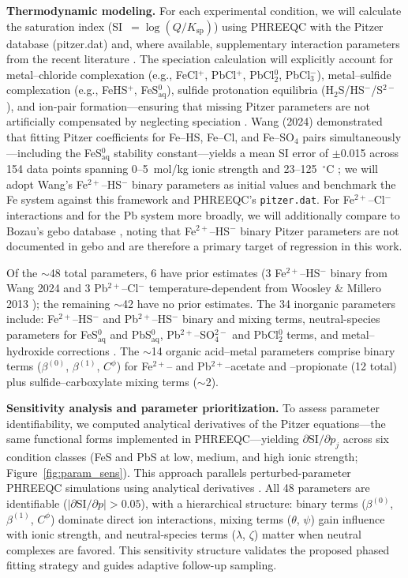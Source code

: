 \documentclass[12pt]{article}
\begin{document}
\textbf{Thermodynamic modeling.} For each experimental condition, we will calculate the saturation index (SI~$= \log(Q/K_{\text{sp}})$) using PHREEQC with the Pitzer database (pitzer.dat) and, where available, supplementary interaction parameters from the recent literature \cite{kan2019,wang2020,felmy2000}. The speciation calculation will explicitly account for metal--chloride complexation (e.g., FeCl$^+$, PbCl$^+$, PbCl$_2^0$, PbCl$_3^-$), metal--sulfide complexation (e.g., FeHS$^+$, FeS$^0_{\text{aq}}$), sulfide protonation equilibria (H$_2$S/HS$^-$/S$^{2-}$), and ion-pair formation---ensuring that missing Pitzer parameters are not artificially compensated by neglecting speciation \cite{felmy2000}. Wang (2024) demonstrated that fitting Pitzer coefficients for Fe--HS, Fe--Cl, and Fe--SO$_4$ pairs simultaneously---including the FeS$^0_{\text{aq}}$ stability constant---yields a mean SI error of $\pm$0.015 across 154 data points spanning 0--5~mol/kg ionic strength and 23--125~$^\circ$C \cite{wang2024}; we will adopt Wang's Fe$^{2+}$--HS$^-$ binary parameters as initial values and benchmark the Fe system against this framework and PHREEQC's \texttt{pitzer.dat}. For Fe$^{2+}$--Cl$^-$ interactions and for the Pb system more broadly, we will additionally compare to Bozau's gebo database \cite{bozau2013}, noting that Fe$^{2+}$--HS$^-$ binary Pitzer parameters are not documented in gebo and are therefore a primary target of regression in this work.

Of the $\sim$48 total parameters, 6 have prior estimates (3 Fe$^{2+}$--HS$^-$ binary from Wang 2024 \cite{wang2024} and 3 Pb$^{2+}$--Cl$^-$ temperature-dependent from Woosley \& Millero 2013 \cite{woosley2013}); the remaining $\sim$42 have no prior estimates. The 34 inorganic parameters include: Fe$^{2+}$--HS$^-$ and Pb$^{2+}$--HS$^-$ binary and mixing terms, neutral-species parameters for FeS$^0_{\text{aq}}$ and PbS$^0_{\text{aq}}$, Pb$^{2+}$--SO$_4^{2-}$ and PbCl$_2^0$ terms, and metal--hydroxide corrections \cite{felmy2000,kan2019,mgaidi1991}. The $\sim$14 organic acid--metal parameters comprise binary terms ($\beta^{(0)}$, $\beta^{(1)}$, $C^\phi$) for Fe$^{2+}$-- and Pb$^{2+}$--acetate and --propionate (12 total) plus sulfide--carboxylate mixing terms ($\sim$2).

\textbf{Sensitivity analysis and parameter prioritization.} To assess parameter identifiability, we computed analytical derivatives of the Pitzer equations---the same functional forms implemented in PHREEQC---yielding $\partial\mathrm{SI}/\partial p_j$ across six condition classes (FeS and PbS at low, medium, and high ionic strength; Figure~\ref{fig:param_sens}). This approach parallels perturbed-parameter PHREEQC simulations using analytical derivatives \cite{pitzer1973}. All 48 parameters are identifiable ($|\partial\mathrm{SI}/\partial p| > 0.05$), with a hierarchical structure: binary terms ($\beta^{(0)}$, $\beta^{(1)}$, $C^\phi$) dominate direct ion interactions, mixing terms ($\theta$, $\psi$) gain influence with ionic strength, and neutral-species terms ($\lambda$, $\zeta$) matter when neutral complexes are favored. This sensitivity structure validates the proposed phased fitting strategy and guides adaptive follow-up sampling.
\end{document}
